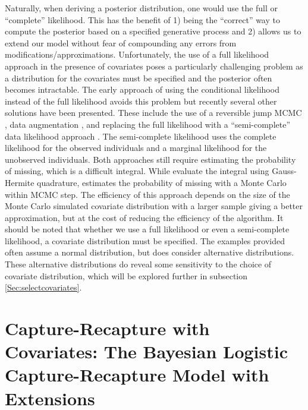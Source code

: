 \documentclass[
  12pt,
]{article}
\begin{document}
Naturally, when deriving a posterior distribution, one would use the
full or ``complete'' likelihood. This has the benefit of 1) being the
``correct'' way to compute the posterior based on a specified generative
process and 2) allows us to extend our model without fear of compounding
any errors from modifications/approximations. Unfortunately, the use of
a full likelihood approach in the presence of covariates poses a
particularly challenging problem as a distribution for the covariates
must be specified and the posterior often becomes intractable. The early
approach of using the conditional likelihood instead of the full
likelihood avoids this problem but recently several other solutions have
been presented. These include the use of a reversible jump MCMC
\citep{king_bayesian_2008}, data augmentation
\citep{royle_analysis_2007,royle_analysis_2009}, and replacing the full
likelihood with a ``semi-complete'' data likelihood approach
\citep{king_capturerecapture_2016}. The semi-complete likelihood uses
the complete likelihood for the observed individuals and a marginal
likelihood for the unobserved individuals. Both approaches still require
estimating the probability of missing, which is a difficult integral.
While \citep{king_capturerecapture_2016} evaluate the integral using
Gauss-Hermite quadrature, \cite{bonner_mcmcmc_2014} estimates the
probability of missing with a Monte Carlo within MCMC step. The
efficiency of this approach depends on the size of the Monte Carlo
simulated covariate distribution with a larger sample giving a better
approximation, but at the cost of reducing the efficiency of the
algorithm. It should be noted that whether we use a full likelihood or
even a semi-complete likelihood, a covariate distribution must be
specified. The examples provided often assume a normal distribution, but
\cite{royle_analysis_2009} does consider alternative distributions.
These alternative distributions do reveal some sensitivity to the choice
of covariate distribution, which will be explored further in subsection
\ref{Sec:selectcovariates}.

\section{Capture-Recapture with Covariates: The Bayesian Logistic Capture-Recapture Model with Extensions}
\label{sec:CRwithCovariates}
\end{document}
